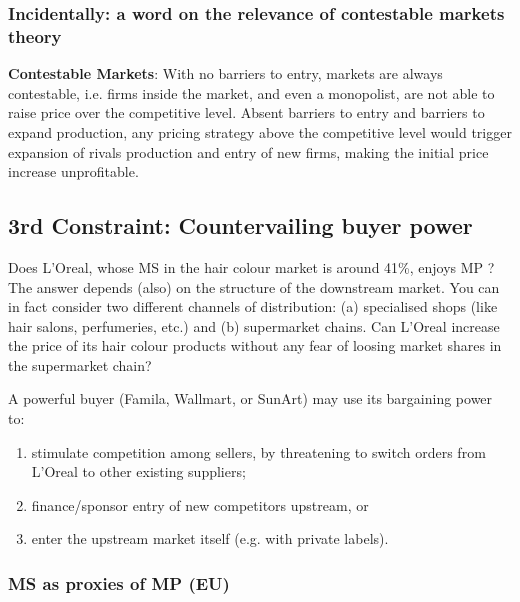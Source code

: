         \subsubsection{Incidentally: a word on the relevance of contestable markets theory}

        \textbf{Contestable Markets}: With no barriers to entry, markets are always contestable, i.e. firms inside the market, and even a monopolist, are not able to raise price over the competitive level. Absent barriers to entry and barriers to expand production, any pricing strategy above the competitive level would trigger expansion of rivals production and entry of new firms, making the initial price increase unprofitable.


\newpage
    \subsection{3rd Constraint: Countervailing buyer power}

        Does L’Oreal, whose MS in the hair colour market is around 41\%, enjoys MP ? The answer depends (also) on the structure of the downstream market. You can in fact consider two different channels of distribution: (a) specialised shops (like hair salons, perfumeries, etc.) and (b) supermarket chains. Can L’Oreal increase the price of its hair colour products without any fear of loosing market shares in the supermarket chain?

        A powerful buyer (Famila, Wallmart, or SunArt) may use its bargaining power to: 
        \begin{enumerate}
            \item stimulate competition among sellers, by threatening to switch orders from L’Oreal to other existing suppliers;
            \item finance/sponsor entry of new competitors upstream, or 
            \item enter the upstream market itself (e.g. with private labels). 
        \end{enumerate}

        \subsubsection{MS as proxies of MP (EU)}

